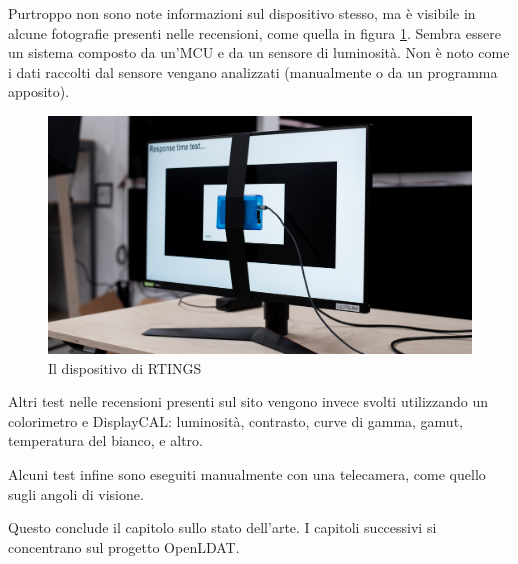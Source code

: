 Purtroppo non sono note informazioni sul dispositivo stesso, ma è visibile in alcune fotografie presenti nelle recensioni, come quella in figura \ref{fig:rtings_device}. Sembra essere un sistema composto da un'MCU e da un sensore di luminosità. Non è noto come i dati raccolti dal sensore vengano analizzati (manualmente o da un programma apposito).

\begin{figure}[h]
	\centering
	\includegraphics[width=\textwidth]{StatoDellArte_files/rtings_device.jpg}
	\caption{Il dispositivo di RTINGS}
	\label{fig:rtings_device}
\end{figure}

Altri test nelle recensioni presenti sul sito vengono invece svolti utilizzando un colorimetro e DisplayCAL: luminosità, contrasto, curve di gamma, gamut, temperatura del bianco, e altro.

Alcuni test infine sono eseguiti manualmente con una telecamera, come quello sugli angoli di visione.

Questo conclude il capitolo sullo stato dell'arte. I capitoli successivi si concentrano sul progetto OpenLDAT.
